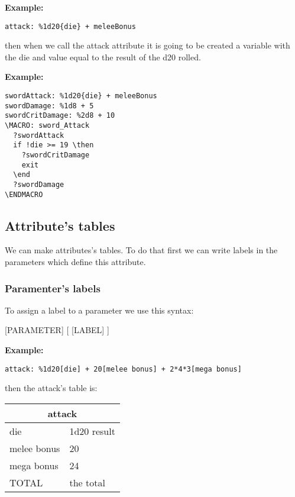 \documentclass[11pt,a4paper,openright,oneside]{book}
\newenvironment{ex}
{
  \setlength{\parindent}{0cm}
  \large \textbf{Example:} \normalsize 
}
{}
\begin{document}
\begin{ex}
  \begin{lstlisting}
attack: %1d20{die} + meleeBonus
  \end{lstlisting}
then when we call the \textsf{attack} attribute it is going to be created a variable with the \textsf{die} and value equal to the result of the d20 rolled.
\end{ex}

\begin{ex}
  \begin{lstlisting}
swordAttack: %1d20{die} + meleeBonus
swordDamage: %1d8 + 5
swordCritDamage: %2d8 + 10
\MACRO: sword_Attack
  ?swordAttack
  if !die >= 19 \then
    ?swordCritDamage
    exit
  \end
  ?swordDamage
\ENDMACRO
  \end{lstlisting}
\end{ex}

\subsection{Attribute's tables} \label{attributesTables}

We can make attributes's tables. To do that first we can write labels in the parameters which define this attribute.

\subsubsection{Paramenter's labels}

To assign a label to a parameter we use this syntax:
\begin{center} \textsf{\textsc{\scriptsize[PARAMETER]} [ \textsc{\scriptsize[LABEL]} ]} \normalsize \end{center}

\begin{ex}
  \begin{lstlisting}
attack: %1d20[die] + 20[melee bonus] + 2*4*3[mega bonus]
  \end{lstlisting}
then the attack's table is:
\begin{table}[!ht]
\scriptsize
\begin{tabular}{|l|l|}
\hline
\multicolumn{2}{|c|}{\textsf{attack}} \\ \hline
 die & 1d20 result  \\ \hline
 melee bonus & 20 \\ \hline
 mega bonus  & 24 \\ \hline
 TOTAL & the total \\ \hline
\end{tabular}
\end{table}
\end{ex}
\end{document}
